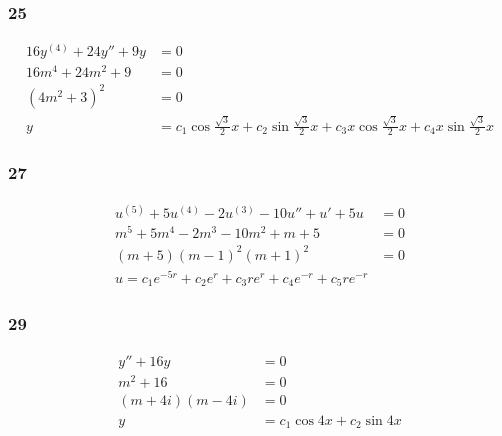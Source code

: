 \documentclass{article}
\begin{document}
\subsubsection{25}

\begin{align*}
  16y^{(4)} + 24y'' + 9y & = 0                                                                                                                                 \\
  16m^4 + 24m^2 + 9      & = 0                                                                                                                                 \\
  (4 m^2 + 3)^2          & = 0                                                                                                                                 \\
  y                      & = c_1 \cos \frac{\sqrt{3}}{2} x + c_2 \sin \frac{\sqrt{3}}{2} x + c_3 x \cos \frac{\sqrt{3}}{2} x + c_4 x \sin \frac{\sqrt{3}}{2} x
\end{align*}


\subsubsection{27}

\begin{align*}
  u^{(5)} + 5u^{(4)} - 2u^{(3)} - 10u'' + u' + 5u & = 0 \\
  m^5 + 5m^4 - 2m^3 - 10m^2 + m + 5               & = 0 \\
  (m + 5) (m - 1)^2 (m + 1)^2                     & = 0 \\
  u = c_1 e^{-5r} + c_2 e^r + c_3 r e^r + c_4 e^{-r} + c_5 r e^{-r}
\end{align*}

\subsubsection{29}

\begin{align*}
  y'' + 16y         & = 0                         \\
  m^2 + 16          & = 0                         \\
  (m + 4i) (m - 4i) & = 0                         \\
  y                 & = c_1 \cos 4x + c_2 \sin 4x \\
\end{align*}
\end{document}

